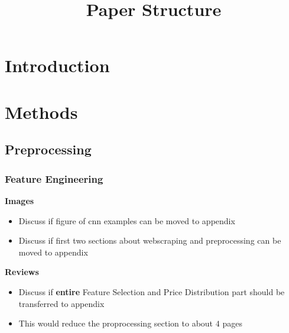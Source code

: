\documentclass[12pt, letterpaper]{article}
\title{Paper Structure}
\author{}
\date{}
\begin{document}
\maketitle
\tableofcontents
\setcounter{tocdepth}{3}


\section{Introduction} %


\section{Methods} %


\subsection{Preprocessing} %

\subsubsection{Feature Engineering} %

\textbf{Images} %

\begin{itemize}
    \item Discuss if figure of cnn examples can be moved to appendix
    \item Discuss if first two sections about webscraping and preprocessing can be moved to appendix
\end{itemize}

\textbf{Reviews} %

\begin{itemize}
    \item Discuss if \textbf{entire} Feature Selection and Price Distribution part should be transferred to appendix
    \item This would reduce the proprocessing section to about $4$ pages
\end{itemize}
\end{document}
